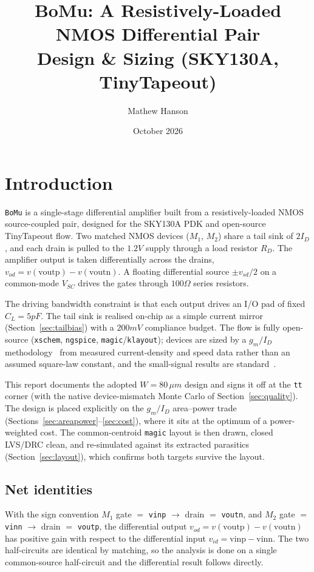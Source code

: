 \documentclass{article}
\title{BoMu: A Resistively-Loaded NMOS Differential Pair\\ Design \& Sizing (SKY130A, TinyTapeout)}
\author{Mathew Hanson}
\date{October 2026}
\begin{document}
\maketitle

\section{Introduction}
\texttt{BoMu} is a single-stage differential amplifier built from a resistively-loaded
NMOS source-coupled pair, designed for the SKY130A PDK and open-source TinyTapeout flow. Two
matched NMOS devices ($M_1$, $M_2$) share a tail sink of $2I_D$, and each drain is
pulled to the $1.2V$ supply through a load resistor $R_D$. The amplifier output is taken
differentially across the drains, $v_{od}=v(\text{voutp})-v(\text{voutn})$. A
floating differential source $\pm v_{sd}/2$ on a common-mode $V_{SC}$ drives the
gates through $100\Omega$ series resistors.

The driving bandwidth constraint is that each output drives an I/O pad of
fixed $C_L=5pF$. The tail sink is realised on-chip as a simple current mirror
(Section~\ref{sec:tailbias}) with a $200mV$ compliance budget. The flow is fully
open-source (\texttt{xschem}, \texttt{ngspice}, \texttt{magic}/\texttt{klayout});
devices are sized by a $g_m/I_D$ methodology~\cite{Jespers_gmID} from measured
current-density and speed data rather than an assumed square-law constant, and the
small-signal results are standard~\cite{Razavi_AnalogCMOS}.

This report documents the adopted $W=80\,\mu m$ design and signs it off at the
\texttt{tt} corner (with the native device-mismatch Monte Carlo of
Section~\ref{sec:quality}). The design is placed explicitly on the $g_m/I_D$
area--power trade (Sections~\ref{sec:areapower}--\ref{sec:cost}), where it sits at the
optimum of a power-weighted cost. The common-centroid \texttt{magic} layout is then
drawn, closed LVS/DRC clean, and re-simulated against its extracted parasitics
(Section~\ref{sec:layout}), which confirms both targets survive the layout.

\subsection{Net identities}
With the sign convention $M_1$ gate $=$ \texttt{vinp} $\rightarrow$ drain $=$
\texttt{voutn}, and $M_2$ gate $=$ \texttt{vinn} $\rightarrow$ drain $=$ \texttt{voutp},
the differential output $v_{od}=v(\text{voutp})-v(\text{voutn})$ has positive
gain with respect to the differential input $v_{id}=\text{vinp}-\text{vinn}$. The two
half-circuits are identical by matching, so the analysis is done on a single common-source
half-circuit and the differential result follows directly.
\end{document}
